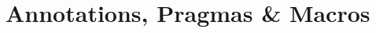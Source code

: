 
\chapter{Annotations, Pragmas \& Macros}
\label{sec:annotations}
\label{sec:pragmas}
\label{sec:macros}

